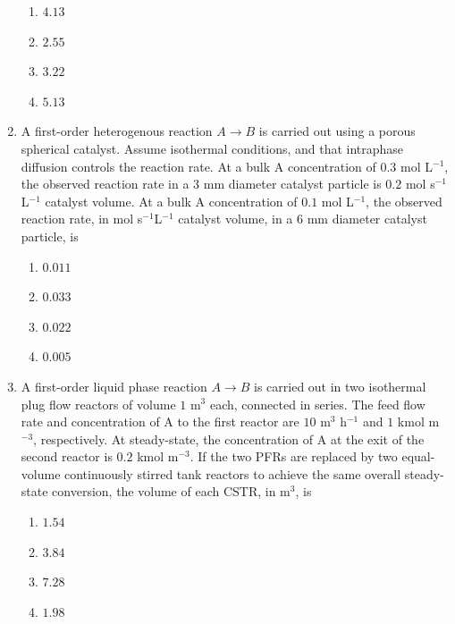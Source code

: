 \documentclass[journal,12pt,onecolumn]{IEEEtran}
\theoremstyle{remark}
\begin{document}
\begin{enumerate}
	\hfill{}
	\begin{enumerate}
		\item $4.13$
		\item $2.55$
		\item $3.22$
		\item $5.13$
	\end{enumerate}
	
	\item A first-order heterogenous reaction $A \to B$ is carried out using a porous spherical catalyst. Assume isothermal conditions, and that intraphase diffusion controls the reaction rate. At a bulk A concentration of $0.3$ mol L$^{-1}$, the observed reaction rate in a $3$ mm diameter catalyst particle is $0.2$ mol s$^{-1}$L$^{-1}$ catalyst volume. At a bulk A concentration of $0.1$ mol L$^{-1}$, the observed reaction rate, in mol s$^{-1}$L$^{-1}$ catalyst volume, in a $6$ mm diameter catalyst particle, is
	
	\hfill{}
	\begin{enumerate}
		\item $0.011$
		\item $0.033$
		\item $0.022$
		\item $0.005$
	\end{enumerate}
	
	\item A first-order liquid phase reaction $A \to B$ is carried out in two isothermal plug flow reactors  of volume $1$ m$^3$ each, connected in series. The feed flow rate and concentration of A to the first reactor are $10$ m$^3$ h$^{-1}$ and $1$ kmol m$^{-3}$, respectively. At steady-state, the concentration of A at the exit of the second reactor is $0.2$ kmol m$^{-3}$. If the two PFRs are replaced by two equal-volume continuously stirred tank reactors  to achieve the same overall steady-state conversion, the volume of each CSTR, in m$^3$, is
	
	\hfill{}
	\begin{enumerate}
		\item $1.54$
		\item $3.84$
		\item $7.28$
		\item $1.98$
	\end{enumerate}
	

\end{enumerate}
\end{document}
